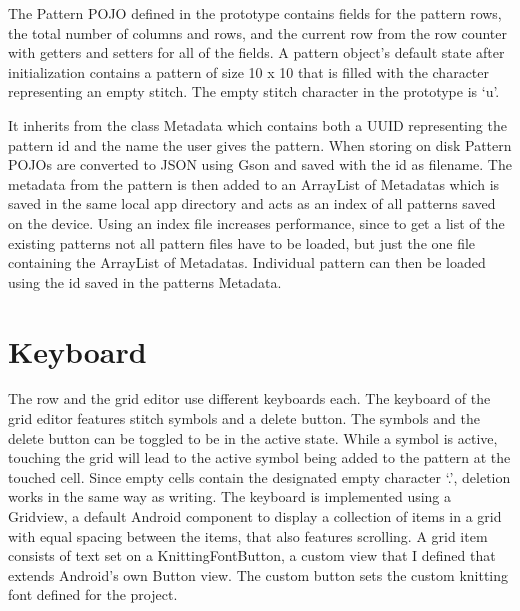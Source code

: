 The Pattern POJO defined in the prototype contains fields for the pattern rows, the total number of columns and rows, and the current row from the row counter with getters and setters for all of the fields. A pattern object’s default state after initialization contains a pattern of size 10 x 10 that is filled with  the character representing an empty stitch. The empty stitch character in the prototype is ‘u’.

It inherits from the class Metadata which contains both a UUID representing the pattern id and the name the user gives the pattern. When storing on disk Pattern POJOs are converted to JSON using Gson and saved with the id as filename. The metadata from the pattern is then added to an ArrayList of Metadatas which is saved in the same local app directory and acts as an index of all patterns saved on the device. Using an index file increases performance, since to get a list of the existing patterns not all pattern files have to be loaded, but just the one file containing the ArrayList of Metadatas. Individual pattern can then be loaded using the id saved in the patterns Metadata.

\section{Keyboard}
The row and the grid editor use different keyboards each. The keyboard of the grid editor features stitch symbols and a delete button. The symbols and the delete button can be toggled to be in the active state. While a symbol is active, touching the grid will lead to the active symbol being added to the pattern at the touched cell. Since empty cells contain the designated empty character ‘.’, deletion works in the same way as writing. The keyboard is implemented using a Gridview, a default Android component to display a collection of items in a grid with equal spacing between the items, that also features scrolling. A grid item consists of text set on a KnittingFontButton, a custom view that I defined that extends Android’s own Button view. The custom button sets the custom knitting font defined for the project.

